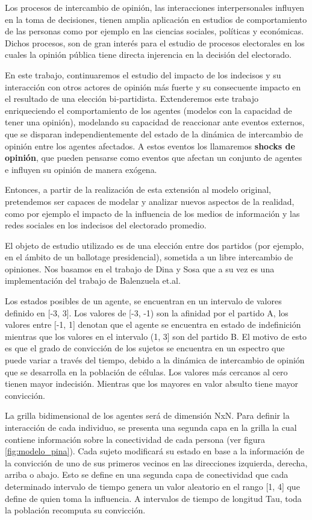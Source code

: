 Los procesos de intercambio de opinión, las interacciones interpersonales influyen en la toma de decisiones, tienen amplia aplicación en estudios de comportamiento de las personas como por ejemplo en las ciencias sociales, políticas y económicas. Dichos procesos, son de gran interés para el estudio de procesos electorales en los cuales la opinión pública tiene directa injerencia en la decisión del electorado.

En este trabajo, continuaremos el estudio del impacto de los indecisos y su
interacción con otros actores de opinión más fuerte y su consecuente impacto en
el resultado de una elección bi-partidista. Extenderemos este trabajo
enriqueciendo el comportamiento de los agentes (modelos con la capacidad de
tener una opinión), modelando su capacidad de reaccionar ante eventos externos,
que se disparan independientemente del estado de la dinámica de intercambio de
opinión entre los agentes afectados. A estos eventos los
llamaremos \textbf{shocks de opinión}, que pueden pensarse como eventos que
afectan un conjunto de agentes e influyen su opinión de manera exógena.

Entonces, a partir de la realización de esta extensión al modelo original, pretendemos ser capaces de modelar y analizar nuevos aspectos de la realidad, como por ejemplo el impacto de la influencia de los medios de información y las redes sociales en los indecisos del electorado promedio.

El objeto de estudio utilizado  es de una elección entre dos partidos (por ejemplo, en el ámbito de un ballotage presidencial), sometida a un libre intercambio de opiniones. Nos basamos en el trabajo de Dina y Sosa\cite{dina2015}  que a su vez es una implementación del trabajo de Balenzuela et.al\cite{balenzuela}.

Los estados posibles de un agente, se encuentran en un intervalo de valores definido en [-3, 3]. Los valores de [-3, -1)  son la afinidad por el partido A, los valores entre [-1, 1] denotan que el agente se encuentra en estado de indefinición mientras que los valores en el intervalo (1, 3] son del partido B.
El motivo de esto es que el grado de convicción de los sujetos se encuentra en un espectro que puede variar a través del tiempo, debido a la dinámica de intercambio de opinión que se desarrolla en la población de células. Los valores más cercanos al cero tienen mayor indecisión. Mientras que los mayores en valor absulto tiene mayor convicción.

La grilla bidimensional de los agentes será de dimensión NxN. Para definir la interacción de cada individuo, se presenta una segunda capa en la grilla la cual contiene información sobre la conectividad de cada persona (ver figura \ref{fig:modelo_pina}). Cada sujeto modificará su estado en base a la información de la convicción de uno de sus primeros vecinos en las direcciones izquierda, derecha, arriba o abajo. Esto se define en una segunda capa de conectividad que cada determinado intervalo de tiempo genera un valor aleatorio en el rango [1, 4] que define de quien toma la influencia. A intervalos de tiempo de longitud Tau, toda la población recomputa su convicción.

